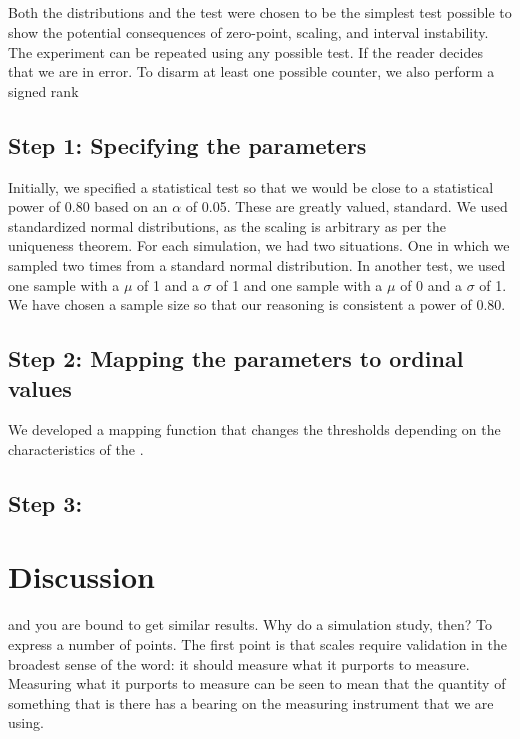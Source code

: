\documentclass[utf8]{FrontiersinVancouver}
\begin{document}
\subsection{}
Both the distributions and the test were chosen to be the simplest test possible to show the potential consequences of zero-point, scaling, and interval instability. The experiment can be repeated using any possible test. If the reader decides that we are in error. To disarm at least one possible counter, we also perform a signed rank 

\subsection{Step 1: Specifying the parameters}
Initially, we specified a statistical test so that we would be close to a statistical power of 0.80 based on an $\alpha$ of 0.05. These are greatly valued, standard.  We used standardized normal distributions, as the scaling is arbitrary as per the uniqueness theorem. For each simulation, we had two situations. One in which we sampled two times from a standard normal distribution. In another test, we used one sample with a $\mu$ of 1 and a $\sigma$ of 1 and one sample with a $\mu$ of 0 and a $\sigma$ of 1. We have chosen a sample size so that our reasoning is consistent a power of 0.80.

\subsection{Step 2: Mapping the parameters to ordinal values}

We developed a mapping function that changes the thresholds depending on the characteristics of the .
\subsection{Step 3: }




\section{Discussion}
and you are bound to get similar results. Why do a simulation study, then? 
To express a number of points. The first point is that scales require validation in the broadest sense of the word: it should measure what it purports to measure. Measuring what it purports to measure can be seen to mean that the quantity of something that is there has a bearing on the measuring instrument that we are using. 
\end{document}
